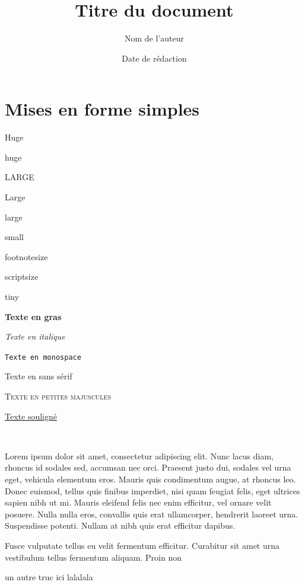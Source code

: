 \documentclass{article}
\author{Nom de l'auteur}
\title{Titre du document}
\date{Date de rédaction}
\begin{document}
\maketitle


\tableofcontents

\section{Mises en forme simples}
\label{sec:mise-en-forme}

{\Huge Huge}

{\huge huge}

{\LARGE LARGE}

{\Large Large}

{\large large}

{\small small}

{\footnotesize footnotesize}

{\scriptsize scriptsize}

{\tiny tiny}

\textbf{Texte en gras}

\textit{Texte en italique}

\texttt{Texte en monospace}

\textsf{Texte en sans sérif}

\textsc{Texte en petites majuscules}

\underline{Texte souligné}

\colorbox{red!50!yellow}{
  \textcolor{white}{\textbf{gras blanc surligné en orange}}
}

\begin{minipage}{5cm}
 Lorem ipsum dolor sit amet, consectetur adipiscing elit. Nunc lacus diam, rhoncus id sodales sed, accumsan nec orci. Praesent justo dui, sodales vel urna eget, vehicula elementum eros. Mauris quis condimentum augue, at rhoncus leo. Donec euismod, tellus quis finibus imperdiet, nisi quam feugiat felis, eget ultrices sapien nibh ut mi. Mauris eleifend felis nec enim efficitur, vel ornare velit posuere. Nulla nulla eros, convallis quis erat ullamcorper, hendrerit laoreet urna. Suspendisse potenti. Nullam at nibh quis erat efficitur dapibus.

 Fusce vulputate tellus eu velit fermentum efficitur. Curabitur sit amet urna vestibulum tellus fermentum aliquam. Proin non
\end{minipage}
\hspace{0cm}
\begin{minipage}{15cm}
  un autre truc ici lalalala
\end{minipage}
\end{document}
